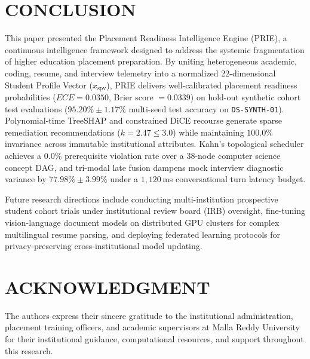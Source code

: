 \documentclass[conference]{IEEEtran}
\begin{document}
\section{CONCLUSION}

This paper presented the Placement Readiness Intelligence Engine (PRIE), a continuous intelligence framework designed to address the systemic fragmentation of higher education placement preparation. By uniting heterogeneous academic, coding, resume, and interview telemetry into a normalized 22-dimensional Student Profile Vector ($x_{\text{spv}}$), PRIE delivers well-calibrated placement readiness probabilities ($ECE = 0.0350$, Brier score $= 0.0339$) on hold-out synthetic cohort test evaluations ($95.20\% \pm 1.17\%$ multi-seed test accuracy on \texttt{DS-SYNTH-01}). Polynomial-time TreeSHAP and constrained DiCE recourse generate sparse remediation recommendations ($k = 2.47 \le 3.0$) while maintaining $100.0\%$ invariance across immutable institutional attributes. Kahn's topological scheduler achieves a $0.0\%$ prerequisite violation rate over a 38-node computer science concept DAG, and tri-modal late fusion dampens mock interview diagnostic variance by $77.98\% \pm 3.99\%$ under a $1,120$\,ms conversational turn latency budget.

Future research directions include conducting multi-institution prospective student cohort trials under institutional review board (IRB) oversight, fine-tuning vision-language document models on distributed GPU clusters for complex multilingual resume parsing, and deploying federated learning protocols for privacy-preserving cross-institutional model updating.

\balance
\section*{ACKNOWLEDGMENT}

The authors express their sincere gratitude to the institutional administration, placement training officers, and academic supervisors at Malla Reddy University for their institutional guidance, computational resources, and support throughout this research.
\end{document}
